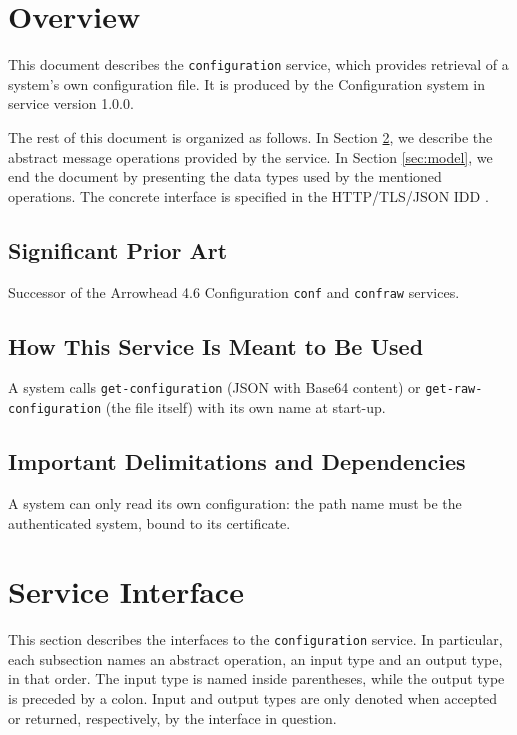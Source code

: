 \documentclass[a4paper]{arrowhead}
\begin{document}
\section{Overview}
\label{sec:overview}

This document describes the \texttt{configuration} service, which provides retrieval of a system's own configuration file.
It is produced by the Configuration system \cite{cfg-sysd} in service version 1.0.0.

The rest of this document is organized as follows.
In Section \ref{sec:operations}, we describe the abstract message operations provided by the service.
In Section \ref{sec:model}, we end the document by presenting the data types used by the mentioned operations.
The concrete interface is specified in the HTTP/TLS/JSON IDD \cite{cfg-configuration-http-idd}.

\subsection{Significant Prior Art}

Successor of the Arrowhead 4.6 Configuration \texttt{conf} and \texttt{confraw} services.

\subsection{How This Service Is Meant to Be Used}

A system calls \texttt{get-\allowbreak{}configuration} (JSON with Base64 content) or \texttt{get-\allowbreak{}raw-\allowbreak{}configuration} (the file itself) with its own name at start-up.

\subsection{Important Delimitations and Dependencies}
\label{sec:delimitations}

A system can only read its own configuration: the path name must be the authenticated system, bound to its certificate.

\newpage

\section{Service Interface}
\label{sec:operations}

This section describes the interfaces to the \texttt{configuration} service.
In particular, each subsection names an abstract operation, an input type and an output type, in that order.
The input type is named inside parentheses, while the output type is preceded by a colon.
Input and output types are only denoted when accepted or returned, respectively, by the interface in question.
\end{document}
